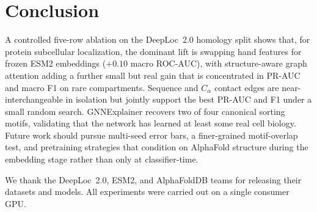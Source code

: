 \documentclass{article}
\begin{document}
\section{Conclusion}\label{sec:conclusion}

A controlled five-row ablation on the DeepLoc~2.0 homology split shows
that, for protein subcellular localization, the dominant lift is
swapping hand features for frozen ESM2 embeddings ($+0.10$ macro
ROC-AUC), with structure-aware graph attention adding a further small
but real gain that is concentrated in PR-AUC and macro F1 on rare
compartments. Sequence and $C_\alpha$ contact edges are
near-interchangeable in isolation but jointly support the best PR-AUC
and F1 under a small random search. GNNExplainer recovers two of four
canonical sorting motifs, validating that the network has learned at
least some real cell biology. Future work should pursue multi-seed
error bars, a finer-grained motif-overlap test, and pretraining
strategies that condition on AlphaFold structure during the embedding
stage rather than only at classifier-time.

\begin{ack}
We thank the DeepLoc~2.0, ESM2, and AlphaFoldDB teams for releasing
their datasets and models. All experiments were carried out on a single
consumer GPU.
\end{ack}

\end{document}
